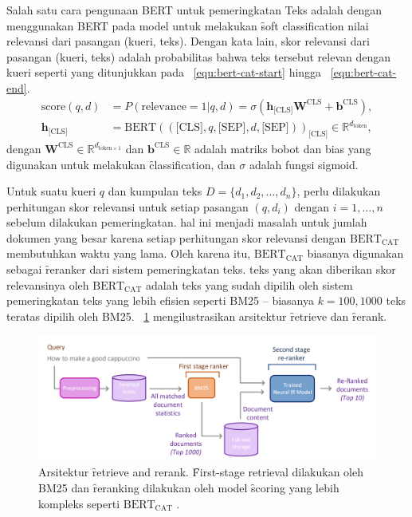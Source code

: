 		Salah satu cara pengunaan BERT untuk pemeringkatan Teks adalah dengan menggunakan BERT pada
		model untuk melakukan \f{soft classification} nilai relevansi dari pasangan (kueri, teks). Dengan kata lain, skor relevansi dari pasangan (kueri, teks) adalah probabilitas bahwa teks tersebut relevan dengan kueri seperti yang ditunjukkan pada \equ~\ref{equ:bert-cat-start} hingga \equ~\ref{equ:bert-cat-end}.
		\begin{align}
			\label{equ:bert-cat-start}
			\text{score}(q,d) &= P(\text{relevance} = 1 | q, d) = \sigma\left(  \mathbf{h}_{\text{[CLS]}} \mathbf{W}^{\text{CLS}}+\mathbf{b}^{\text{CLS}} \right), \\
			\label{equ:bert-cat-end}
			\mathbf{h}_{\text{[CLS]}} &= \text{BERT}((\text{[CLS]}, q, \text{[SEP]}, d, \text{[SEP]}))_{\text{[CLS]}} \in \mathbb{R}^{d_{\text{token}}},
		\end{align}
		dengan $\mathbf{W}^{\text{CLS}} \in \mathbb{R}^{d_{\text{token} \times 1}}$ dan $\mathbf{b}^{\text{CLS}} \in \mathbb{R}$ adalah matriks bobot dan bias yang digunakan untuk melakukan \f{classification}, dan $\sigma$ adalah fungsi sigmoid.

		Untuk suatu kueri $q$ dan kumpulan teks $D = \{d_1, d_2, \dots, d_n\}$, perlu dilakukan perhitungan skor relevansi untuk setiap pasangan $(q, d_i)$ dengan $i=1,\dots,n$ sebelum dilakukan pemeringkatan. hal ini menjadi masalah untuk jumlah dokumen yang besar karena setiap perhitungan skor relevansi dengan $\text{BERT}_{\text{CAT}}$ membutuhkan waktu yang lama. Oleh karena itu, $\text{BERT}_{\text{CAT}}$ biasanya digunakan sebagai \f{reranker} dari sistem pemeringkatan teks. teks yang akan diberikan skor relevansinya oleh $\text{BERT}_{\text{CAT}}$ adalah teks yang sudah dipilih oleh sistem pemeringkatan teks yang lebih efisien seperti {BM25} -- biasanya $k = 100, 1000$ teks teratas dipilih oleh {BM25}. \pic~\ref{fig:bert-cat-withbm25} mengilustrasikan arsitektur \f{retrieve} dan \f{rerank}.

		\begin{figure}
			\centering
			\includegraphics[width=1\textwidth]{assets/pics/neural-ir.png}
			\caption{Arsitektur \f{retrieve and rerank}. \f{First-stage retrieval} dilakukan oleh {BM25} dan \f{reranking} dilakukan oleh model \f{scoring} yang lebih kompleks seperti $\text{BERT}_{\text{CAT}}$ \citep{irlecture}.}
			\label{fig:bert-cat-withbm25}
		\end{figure}

